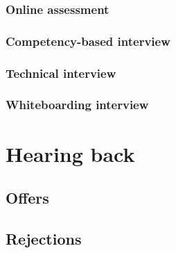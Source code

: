 \subsubsection{Online assessment}
\subsubsection{Competency-based interview}
\subsubsection{Technical interview}
\subsubsection{Whiteboarding interview}
\section{Hearing back}
\subsection{Offers}
\subsection{Rejections}